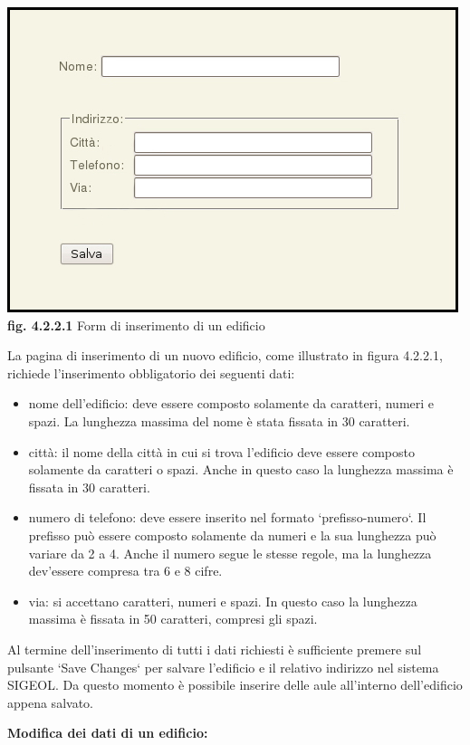 \documentclass[11pt,a4paper]{article}
\begin{document}
\begin{center}
	\includegraphics[scale=0.5]{images/nuovo_edificio.jpg}\\
	\textbf{fig. 4.2.2.1} Form di inserimento di un edificio\\
\end{center}

La pagina di inserimento di un nuovo edificio, come illustrato in figura 4.2.2.1, richiede l'inserimento obbligatorio dei seguenti dati:
\begin{itemize}
 \item nome dell'edificio: deve essere composto solamente da caratteri, numeri e spazi. La lunghezza massima del nome è stata fissata in 30 caratteri.
 \item città: il nome della città in cui si trova l'edificio deve essere composto solamente da caratteri o spazi. Anche in questo caso la lunghezza massima è fissata in 30 caratteri.
 \item numero di telefono: deve essere inserito nel formato `prefisso-numero`. Il prefisso può essere composto solamente da numeri e la sua lunghezza può variare da 2 a 4. Anche il numero segue le stesse regole, ma la lunghezza dev'essere compresa tra 6 e 8 cifre.
 \item via: si accettano caratteri, numeri e spazi. In questo caso la lunghezza massima è fissata in 50 caratteri, compresi gli spazi.
\end{itemize}
Al termine dell'inserimento di tutti i dati richiesti è sufficiente premere sul pulsante `Save Changes` per salvare l'edificio e il relativo indirizzo nel sistema SIGEOL.
Da questo momento è possibile inserire delle aule all'interno dell'edificio appena salvato.
\newline \newline
\begin{large}\textbf{Modifica dei dati di un edificio:}\end{large}
\end{document}
